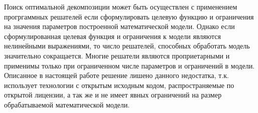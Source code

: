 Поиск оптимальной декомпозиции может быть осуществлен с применением прогргаммных решателей если сформулировать целевую функцию и ограничения на значения параметров построенной математической модели. Однако если сформулированная целевая функция и ограничения к модели являются нелинейными выражениями, то число решателей, способных обработать модель значительно сокращается. Многие решатели являются проприетарными и применимы только при ограниченном числе параметров и ограничений в модели. Описанное в настоящей работе решение лишено данного недостатка, т.к. использует технологии с открытым исходным кодом, распространяемые по открытой лицензии, а так же и не имеет явных ограничений на размер обрабатываемой математической модели.

